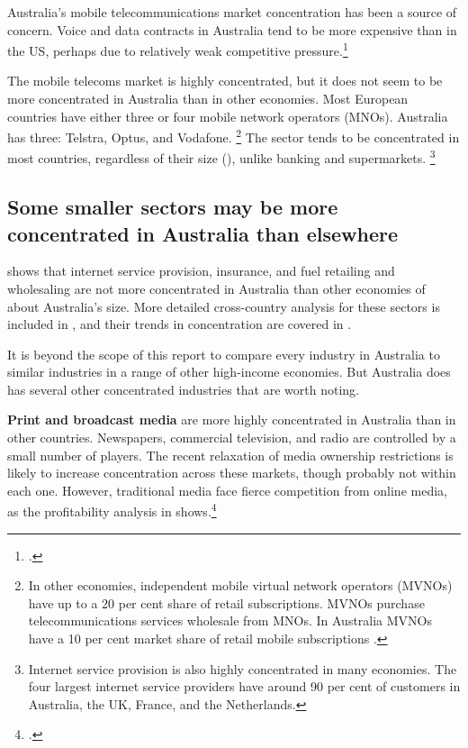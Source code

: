 Australia's mobile telecommunications market concentration has been a source of concern. Voice and data contracts in Australia tend to be more expensive than in the US, perhaps due to relatively weak competitive pressure.\footcites{Law_mobile_2017, Hatch_mobile_2016}

The mobile telecoms market is highly concentrated, but it does not seem to be more concentrated in Australia than in other economies. Most European countries have either three or four mobile network operators (MNOs). Australia has three: Telstra, Optus, and Vodafone.%
\footnote{In other economies, independent mobile virtual network operators (MVNOs) have up to a 20 per cent share of retail subscriptions. MVNOs purchase telecommunications services wholesale from MNOs. In Australia MVNOs have a 10 per cent market share of retail mobile subscriptions \parencites{ACMA_Telco}{Netherlands_MVNO}.} %
The sector tends to be concentrated in most countries, regardless of their size (), unlike banking and supermarkets.%
\footnote{Internet service provision is also highly concentrated in many economies.
The four largest internet service providers have around 90 per cent of customers in Australia, the UK, France, and the Netherlands.}

\subsection{Some smaller sectors may be more concentrated in Australia than elsewhere}

 shows that internet service provision, insurance, and fuel retailing and wholesaling are not more concentrated in Australia than other economies of about Australia's size. More detailed cross-country analysis for these sectors is included in , and their trends in concentration are covered in .  

It is beyond the scope of this report to compare every industry in Australia to similar industries in a range of other high-income economies. But Australia does has several other concentrated industries that are worth noting. 


\textbf{Print and broadcast media} are more highly concentrated in Australia than in other countries. Newspapers, commercial television, and radio are controlled by a small number of players. The recent relaxation of media ownership restrictions is likely to increase concentration across these markets, though probably not within each one. However, traditional media face fierce competition from online media, as the profitability analysis in  shows.\footcite{Convo_media_2016}


